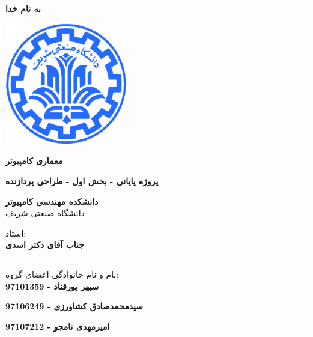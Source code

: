 \documentclass[12pt,titlepage,a4page , tikz , multi,table , svgnames,xcdraw]{article}
\begin{document}
\begin{titlepage}

 \begin{center}
        
       \vspace*{1cm}

 \vspace{1cm}
       \textbf{ \Huge{به نام خدا} }
       \vspace{0.4cm}
       
       \includegraphics[width=0.4\textwidth]{sharif1.png}
       
 	\vspace{0.7cm}
       \textbf{ \LARGE{معماری کامپیوتر} }

 
   \vspace{0.7cm}
  \textbf{ \Large{ پروژه پایانی - بخش اول - طراحی پردازنده} }
   \vspace{0.5cm}
       
 
      \large \textbf{دانشکده مهندسی کامپیوتر}\\\vspace{0.2cm}
    \large   دانشگاه صنعتی شریف\\\vspace{0.25cm}
      
استاد:\\
    \textbf{{جناب آقای دکتر اسدی}}

    \vspace{0.15cm}
    \noindent\rule[1ex]{\linewidth}{3pt}
    
    \vspace{0.5cm}
نام و نام خانوادگی اعضای گروه:\\
    \textbf{{سپهر پورقناد - 97101359}}
        \vspace{0.1cm}
        
     \textbf{{سیدمحمدصادق کشاورزی - 97106249}}
        \vspace{0.1cm}
        
       \textbf{{امیرمهدی نامجو - 97107212}}
        \vspace{0.1cm}


\end{center}
\end{titlepage}
\end{document}

